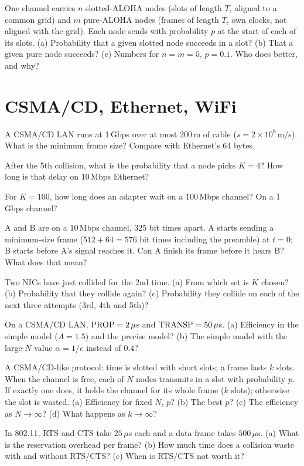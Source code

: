 One channel carries $n$ slotted-ALOHA nodes (slots of length $T$, aligned to a common grid) and $m$ pure-ALOHA nodes (frames of length $T$, own clocks, not aligned with the grid).
Each node sends with probability $p$ at the start of each of its slots.
(a) Probability that a given slotted node succeeds in a slot? (b) That a given pure node succeeds? (c) Numbers for $n=m=5$, $p=0.1$. Who does better, and why?

\section{CSMA/CD, Ethernet, WiFi}

A CSMA/CD LAN runs at 1\,Gbps over at most 200\,m of cable ($s=2\times10^8$\,m/s). What is the minimum frame size? Compare with Ethernet's 64 bytes.

After the 5th collision, what is the probability that a node picks $K=4$? How long is that delay on 10\,Mbps Ethernet?

For $K=100$, how long does an adapter wait on a 100\,Mbps channel? On a 1\,Gbps channel?

A and B are on a 10\,Mbps channel, 325 bit times apart. A starts sending a minimum-size frame ($512+64=576$ bit times including the preamble) at $t=0$; B starts before A's signal reaches it.
Can A finish its frame before it hears B? What does that mean?

Two NICs have just collided for the 2nd time. (a) From which set is $K$ chosen? (b) Probability that they collide again? (c) Probability they collide on each of the next three attempts (3rd, 4th and 5th)?

On a CSMA/CD LAN, $\text{PROP}=2\,\mu$s and $\text{TRANSP}=50\,\mu$s.
(a) Efficiency in the simple model ($A=1.5$) and the precise model? (b) The simple model with the large-$N$ value $\alpha=1/e$ instead of $0.4$?

A CSMA/CD-like protocol: time is slotted with short slots; a frame lasts $k$ slots. When the channel is free, each of $N$ nodes transmits in a slot with probability $p$.
If exactly one does, it holds the channel for its whole frame ($k$ slots); otherwise the slot is wasted.
(a) Efficiency for fixed $N$, $p$? (b) The best $p$? (c) The efficiency as $N\to\infty$? (d) What happens as $k\to\infty$?

In 802.11, RTS and CTS take $25\,\mu$s each and a data frame takes $500\,\mu$s.
(a) What is the reservation overhead per frame? (b) How much time does a collision waste with and without RTS/CTS? (c) When is RTS/CTS not worth it?

